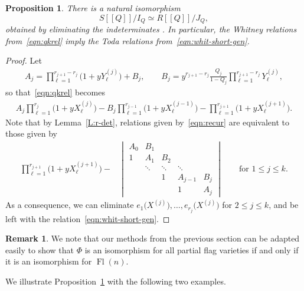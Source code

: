 \documentclass[pdftex]{sigma}
\numberwithin{equation}{section}
\newtheorem{Proposition}[Theorem]{Proposition}
\theoremstyle{definition}
\newtheorem{Remark}[Theorem]{Remark}
\newcommand{\dbb}[1]{[\![#1]\!]}
\DeclareMathOperator{\Fl}{Fl}
\begin{document}
 \begin{Proposition}\label{prop:whit-toda}
 There is a natural isomorphism
 \[ S[\![Q]\!]/I_Q \simeq R\dbb{Q}/J_Q ,\]
 obtained by eliminating the indeterminates . In particular,
 the Whitney relations from~\eqref{eqn:qkrel} imply the
 Toda relations from~\eqref{eqn:whit-short-gen}.
 \end{Proposition}
 \begin{proof}
 Let
 \begin{align*}
 A_j=\prod_{\ell=1}^{r_{j+1}-r_j}\bigl(1+y Y^{(j)}_\ell\bigr)+B_j,\qquad B_j=y^{{r_{j+1}-r_j}}\frac{Q_j}{1-Q_j}\prod_{\ell=1}^{r_{j+1}-r_j}Y^{(j)}_\ell,
 \end{align*}
 so that~\eqref{eqn:qkrel} becomes
 \begin{align}\label{eqn:recur}
 A_j\prod_{\ell=1}^{r_j}\bigl(1+yX^{(j)}_\ell\bigr) -B_j\prod_{\ell=1}^{r_{j-1}}\bigl(1+yX^{(j-1)}_\ell\bigr) -\prod_{\ell=1}^{r_{j+1}}\bigl(1+y X^{(j+1)}_\ell\bigr).
 \end{align}
 Note that by Lemma~\ref{L:r-det}, relations given by~\eqref{eqn:recur} are equivalent to those given by
 \begin{align*}%
 \prod_{\ell=1}^{r_{j+1}}\bigl(1+y X^{(j+1)}_\ell\bigr)-
 &\begin{vmatrix}
 A_0 & B_1 & & & \\
 1 & A_1 & B_2 & & \\ & \ddots & \ddots & \ddots & \\ & & 1 & A_{j-1} & B_{j}\\ & & & 1 & A_{j}
 \end{vmatrix}\qquad \text{for $1\leq j\leq k$}.
 \end{align*}
 As a consequence, we can eliminate $e_1\bigl(X^{(j)}\bigr),\dots, e_{r_j}\bigl(X^{(j)}\bigr)$ for $2\leq j\leq k$, and be left with the relation~\eqref{eqn:whit-short-gen}.
 \end{proof}
\begin{Remark}\label{rmk:QKW} We note that our methods from the previous section can be adapted easily to show that $\Phi$ is an isomorphism for all partial flag varieties if and only if it is an isomorphism for $\Fl(n)$. \end{Remark}

 We illustrate Proposition~\ref{prop:whit-toda} with the following two examples.
\end{document}

